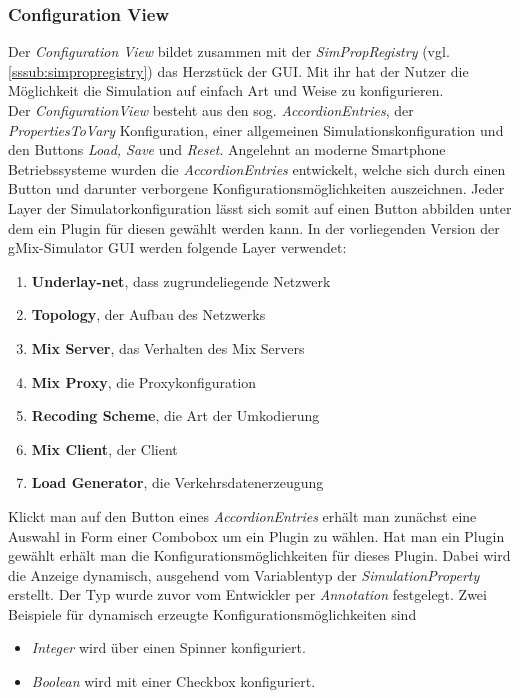 \documentclass[a4paper, 11pt]{article} %
\begin{document}
\subsubsection{Configuration View} %
\label{ssub:configview}
Der \emph{Configuration View} bildet zusammen mit der \emph{SimPropRegistry} (vgl. \ref{sssub:simpropregistry}) das Herzstück der GUI. Mit ihr hat der Nutzer die Möglichkeit die Simulation auf einfach Art und Weise zu konfigurieren. \\
Der \emph{ConfigurationView} besteht aus den sog. \emph{AccordionEntries}, der \emph{PropertiesToVary} Konfiguration, einer allgemeinen Simulationskonfiguration und den Buttons \emph{Load, Save} und \emph{Reset}. Angelehnt an moderne Smartphone Betriebssysteme wurden die \emph{AccordionEntries} entwickelt, welche sich durch einen Button und darunter verborgene Konfigurationsmöglichkeiten auszeichnen. Jeder Layer der Simulatorkonfiguration lässt sich somit auf einen Button abbilden unter dem ein Plugin für diesen gewählt werden kann. In der vorliegenden Version der gMix-Simulator GUI werden folgende Layer verwendet:
\begin{enumerate}
\item \textbf{Underlay-net}, dass zugrundeliegende Netzwerk
\item \textbf{Topology}, der Aufbau des Netzwerks
\item \textbf{Mix Server}, das Verhalten des Mix Servers
\item \textbf{Mix Proxy}, die Proxykonfiguration
\item \textbf{Recoding Scheme}, die Art der Umkodierung
\item \textbf{Mix Client}, der Client
\item \textbf{Load Generator}, die Verkehrsdatenerzeugung
\end{enumerate}
 Klickt man auf den Button eines \emph{AccordionEntries} erhält man zunächst eine Auswahl in Form einer Combobox um ein Plugin zu wählen. Hat man ein Plugin gewählt erhält man die Konfigurationsmöglichkeiten für dieses Plugin. Dabei wird die Anzeige dynamisch, ausgehend vom Variablentyp der \emph{SimulationProperty} erstellt. Der Typ wurde zuvor vom Entwickler per \emph{Annotation} festgelegt. Zwei Beispiele für dynamisch erzeugte Konfigurationsmöglichkeiten sind
 \begin{itemize}
 \item \emph{Integer} wird über einen Spinner konfiguriert. 
 \item \emph{Boolean} wird mit einer Checkbox konfiguriert.
 \end{itemize}
\end{document}
